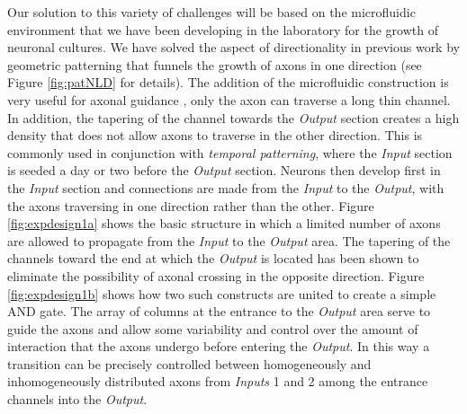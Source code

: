 Our solution to this variety of challenges will be based on the microfluidic environment that we have been developing in the laboratory for the growth of neuronal cultures. We have solved the aspect of directionality in previous work \cite{Feinerman2008} by geometric patterning that funnels the growth of axons in one direction (see Figure \ref{fig:patNLD} for details). The addition of the microfluidic construction is very useful for axonal guidance \cite{Peyrin2011,Park2006,Taylor2005}, only the axon can traverse a long thin channel. In addition, the tapering of the channel towards the {\it Output} section creates a high density that does not allow axons to traverse in the other direction. This is commonly used in conjunction with {\it temporal patterning}, where the {\it Input} section is seeded a day or two before the {\it Output} section. Neurons then develop first in the {\it Input} section and connections are made from the {\it Input} to the {\it Output}, with the axons traversing in one direction rather than the other.
Figure \ref{fig:expdesign1a} shows the basic structure in which a limited number of axons are allowed to propagate from the {\it Input} to the {\it Output} area. The tapering of the channels toward the end at which the {\it Output} is located has been shown \cite{Peyrin2011} to eliminate the possibility of axonal crossing in the opposite direction. Figure \ref{fig:expdesign1b} shows how two such constructs are united to create a simple AND gate. The array of columns at the entrance to the {\it Output} area serve to guide the axons and allow some variability and control over the amount of interaction that the axons undergo before entering the {\it Output}. In this way a transition can be precisely controlled between homogeneously and inhomogeneously distributed axons from {\it Inputs} 1 and 2 among the entrance channels into the {\it Output}.

